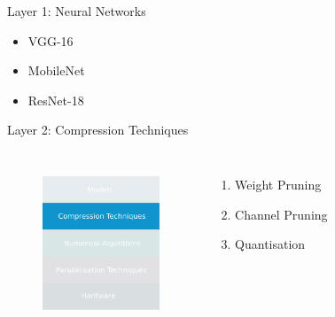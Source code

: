 \documentclass[xcolor=dvipsnames]{beamer}
\begin{document}
\begin{frame}{Layer 1: Neural Networks}
\vspace{0.2cm}

\begin{itemize}
    \item VGG-16
    \item MobileNet
    \item ResNet-18
\end{itemize}

\end{frame}


\begin{frame}{Layer 2: Compression Techniques}

\begin{columns}
\begin{figure}
    \centering
    \includegraphics[width=3.5cm]{images/compressions.pdf}
    \label{fig:inference-stack-compress-1}
\end{figure}


\begin{enumerate}
    \item Weight Pruning
    \item Channel Pruning
    \item Quantisation
\end{enumerate}


\end{columns}

\end{frame}
\end{document}

